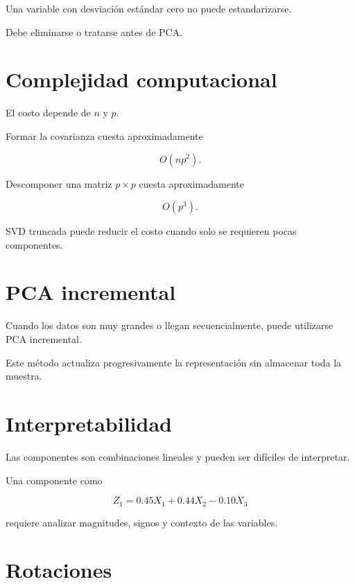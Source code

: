 \documentclass[
  spanish,
  10.5pt,
  letterpaper,
  DIV=11,
  numbers=noendperiod,
  oneside,
  open=any]{scrreprt}
\theoremstyle{definition}
\theoremstyle{definition}
\theoremstyle{plain}
\theoremstyle{remark}
\begin{document}

Una variable con desviación estándar cero no puede estandarizarse.

Debe eliminarse o tratarse antes de PCA.

\section*{Complejidad computacional}\label{complejidad-computacional-4}


El costo depende de \(n\) y \(p\).

Formar la covarianza cuesta aproximadamente

\[
O(np^2).
\]

Descomponer una matriz \(p\times p\) cuesta aproximadamente

\[
O(p^3).
\]

SVD truncada puede reducir el costo cuando solo se requieren pocas
componentes.

\section*{PCA incremental}\label{pca-incremental}


Cuando los datos son muy grandes o llegan secuencialmente, puede
utilizarse PCA incremental.

Este método actualiza progresivamente la representación sin almacenar
toda la muestra.

\section*{Interpretabilidad}\label{interpretabilidad-1}


Las componentes son combinaciones lineales y pueden ser difíciles de
interpretar.

Una componente como

\[
Z_1
=
0.45X_1
+
0.44X_2
-
0.10X_3
\]

requiere analizar magnitudes, signos y contexto de las variables.

\section*{Rotaciones}\label{rotaciones}
\end{document}
